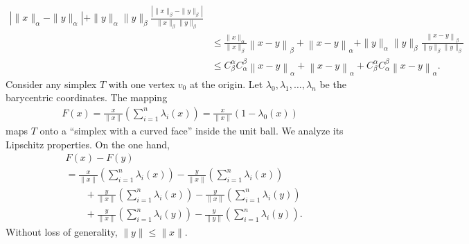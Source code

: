 \documentclass[a4paper]{article}
\begin{document}
\begin{align*}
        \left| \| x \|_{\alpha} - \| y \|_{\alpha} \right|
            + 
        \| y \|_{\alpha} \| y \|_{\beta} 
        \frac{ \left| \| x \|_{\beta} - \| y \|_{\beta} \right| }{ \| x \|_{\beta} \| y \|_{\beta} }
        \\&\leq 
        \frac{ \| x \|_{\alpha} }{ \| x \|_{\beta} } 
        \left\| x - y \right\|_{\beta}
            + 
        \left\| x - y \right\|_{\alpha}
            + 
        \| y \|_{\alpha} \| y \|_{\beta} 
        \frac{ \left\| x - y \right\|_{\beta} }{ \| y \|_{\beta} \| y \|_{\beta} }
        \\&\leq 
        C^{\alpha}_{\beta} 
        C^{\beta}_{\alpha}
        \left\| x - y \right\|_{\alpha}
            + 
        \left\| x - y \right\|_{\alpha}
            + 
        C^{\alpha}_{\beta} 
        C^{\beta}_{\alpha}
        \left\| x - y \right\|_{\alpha}
        .
    \end{align*}
    Consider any simplex $T$ with one vertex $v_0$ at the origin. 
    Let $\lambda_{0}, \lambda_{1}, \dots, \lambda_{n}$ be the barycentric coordinates. 
    The mapping 
    \begin{align}
        F(x) = \frac{x}{\|x\|} \left( \sum_{i=1}^{n} \lambda_{i}(x) \right) = \frac{x}{\|x\|} \left( 1 - \lambda_{0}(x) \right)
    \end{align}
    maps $T$ onto a ``simplex with a curved face'' inside the unit ball. We analyze its Lipschitz properties.
    On the one hand, 
    \begin{align}
        &
        F(x) - F(y)
        \\&
        =
        \frac{x}{\|x\|} \left( \sum_{i=1}^{n} \lambda_{i}(x) \right)
        -
        \frac{y}{\|x\|} \left( \sum_{i=1}^{n} \lambda_{i}(x) \right)
        \\&\qquad 
        +
        \frac{y}{\|x\|} \left( \sum_{i=1}^{n} \lambda_{i}(x) \right)
        -
        \frac{y}{\|x\|} \left( \sum_{i=1}^{n} \lambda_{i}(y) \right)
        \\&\qquad 
        +
        \frac{y}{\|x\|} \left( \sum_{i=1}^{n} \lambda_{i}(y) \right)
        -
        \frac{y}{\|y\|} \left( \sum_{i=1}^{n} \lambda_{i}(y) \right)
        .    
    \end{align}
    Without loss of generality, $\|y\| \leq \|x\|$. 
\end{document}
